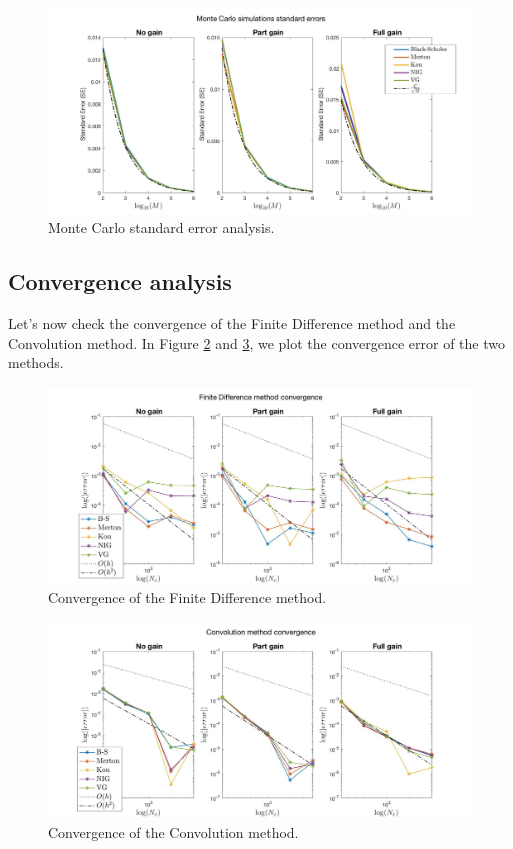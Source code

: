 \begin{figure}[!htb]
\centering
	\includegraphics[width=\textwidth]{gfx/MC_error}
	\caption{Monte Carlo standard error analysis.}
	\label{fig:MC_error}
\end{figure}

\subsection{Convergence analysis}
Let's now check the convergence of the Finite Difference method and the Convolution method. In Figure \ref{fig:fd_conv} and \ref{fig:conv_conv}, we plot the convergence error of the two methods. 

\begin{figure}[!htb]
\centering
	\includegraphics[width=\textwidth]{gfx/FD_convergence}
	\caption{Convergence of the Finite Difference method.}
	\label{fig:fd_conv}
\end{figure}

\begin{figure}[!htb]
\centering
	\includegraphics[width=\textwidth]{gfx/Conv_convergence}
	\caption{Convergence of the Convolution method.}
	\label{fig:conv_conv}
\end{figure}


